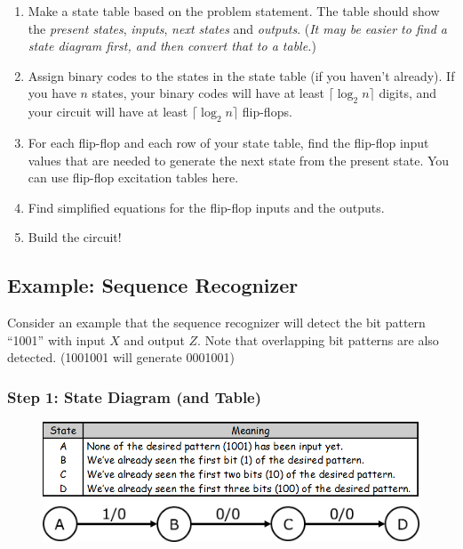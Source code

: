\begin{enumerate}[label=Step\ \arabic*:, leftmargin=*]
  \item Make a state table based on the problem statement. The table should show the \textit{present states}, \textit{inputs}, \textit{next states} and \textit{outputs}. (\textit{It may be easier to find a state diagram first, and then convert that to a table.})
  \item Assign binary codes to the states in the state table (if you haven't already). If you have $n$ states, your binary codes will have at least $\lceil \log_2 n \rceil$ digits, and your circuit will have at least $\lceil \log_2 n  \rceil$ flip-flops.
  \item For each flip-flop and each row of your state table, find the flip-flop input values that are needed to generate the next state from the present state. You can use flip-flop excitation tables here.
  \item Find simplified equations for the flip-flop inputs and the outputs.
  \item Build the circuit!
\end{enumerate}

\vspace*{\fill}
\columnbreak

\subsection{Example: Sequence Recognizer}
\label{subsec:example-seq-recozginer}

Consider an example that the sequence recognizer will detect the bit pattern ``1001'' with input $X$ and output $Z$. Note that overlapping bit patterns are also detected. (1001001 will generate 0001001)

\subsubsection{Step 1: State Diagram (and Table)}
\label{subsubsec:step1-state-diagram-table}

\begin{figure}[H]
  \centering
  \begin{minipage}{\linewidth}
    \centering
    \includegraphics[width=\linewidth]{img/desing-example-table.png}
  \end{minipage}
  \begin{minipage}{\linewidth}
    \centering
    \includegraphics[width=\linewidth]{img/design-example-state-diagram.png}
  \end{minipage}
\end{figure}

